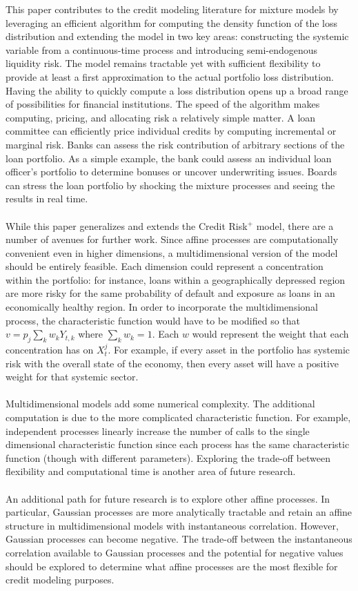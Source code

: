 \documentclass[12pt]{article}
\theoremstyle{definition}
\begin{document}
This paper contributes to the credit modeling literature for mixture models by leveraging an efficient algorithm for computing the density function of the loss distribution and extending the model in two key areas: constructing the systemic variable from a continuous-time process and introducing semi-endogenous liquidity risk.  The model remains tractable yet with sufficient flexibility to provide at least a first approximation to the actual portfolio loss distribution.  Having the ability to quickly compute a loss distribution opens up a broad range of possibilities for financial institutions.  The speed of the algorithm makes computing, pricing, and allocating risk a relatively simple matter.  A loan committee can efficiently price individual credits by computing incremental or marginal risk.  Banks can assess the risk contribution of arbitrary sections of the loan portfolio.  As a simple example, the bank could assess an individual loan officer's portfolio to determine bonuses or uncover underwriting issues.  Boards can stress the loan portfolio by shocking the mixture processes and seeing the results in real time.  
\\
\\
While this paper generalizes and extends the Credit Risk\(^+\) model, there are a number of avenues for further work.  Since affine processes are computationally convenient even in higher dimensions, a multidimensional version of the model should be entirely feasible.  Each dimension could represent a concentration within the portfolio: for instance, loans within a geographically depressed region are more risky for the same probability of default and exposure as loans in an economically healthy region.  In order to incorporate the multidimensional process, the characteristic function would have to be modified so that \(v=p_j \sum_k w_k Y_{t, k} \) where \(\sum_k w_k=1\).  Each \(w\) would represent the weight that each concentration has on \(X_t ^ j\).  For example, if every asset in the portfolio has systemic risk with the overall state of the economy, then every asset will have a positive weight for that systemic sector.  
\\
\\
Multidimensional models add some numerical complexity.  The additional computation is due to the more complicated characteristic function.  For example, independent processes linearly increase the number of calls to the single dimensional characteristic function since each process has the same characteristic function (though with different parameters).  Exploring the trade-off between flexibility and computational time is another area of future research.
\\
\\
An additional path for future research is to explore other affine processes.  In particular, Gaussian processes are more analytically tractable and retain an affine structure in multidimensional models with instantaneous correlation.   However, Gaussian processes can become negative.  The trade-off between the instantaneous correlation available to Gaussian processes and the potential for negative values should be explored to determine what affine processes are the most flexible for credit modeling purposes. 
\end{document}
